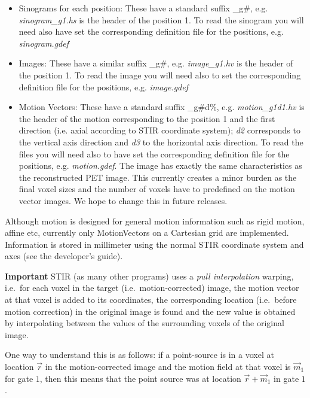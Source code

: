\documentclass{article}
\begin{document}
\begin{itemize}
\item Sinograms for each position: 
These have a standard suffix \_g\#, e.g. \textit{sinogram\_g1.hs} is the header of the
position 1. To read the sinogram you will need also have set the corresponding
definition file for the positions, e.g. \textit{sinogram.gdef}

\item Images:
These have a similar suffix \_g\#, e.g. \textit{image\_g1.hv} is the header of the
position 1. To read the image you will need also to set the corresponding
definition file for the positions, e.g. \textit{image.gdef}

\item Motion Vectors:
These have a standard suffix \_g\#d\%, e.g. \textit{motion\_g1d1.hv} is the header of the motion
corresponding to the position 1 and the first direction (i.e. axial according
to STIR coordinate system); \textit{d2} corresponds to the vertical axis
direction and \textit{d3} to the horizontal axis direction. To read the files you
will need also to have set the corresponding definition file for the positions,
e.g. \textit{motion.gdef}. The image has exactly the same characteristics as the
reconstructed PET image. This currently creates a minor burden as the final
voxel sizes and the number of voxels have to predefined on the motion vector
images. We hope to change this in future releases. 
\end{itemize}

{}

Although motion is designed for general motion
information such as rigid motion, affine etc, currently only MotionVectors on a
Cartesian grid are implemented. Information is stored in millimeter using the normal
STIR coordinate system and axes (see the developer's guide).

\textbf{Important} STIR (as many other programs) uses a 
\textit{pull interpolation} warping, i.e.\ for each voxel in the target
(i.e.\ motion-corrected) image, the motion vector
at that voxel is added to its coordinates, the corresponding location (i.e.\ before motion correction)
in the original image is found and the new value is obtained by interpolating 
between the values of the surrounding voxels of the original image.

One way to understand this is as follows: if a point-source is in a voxel at location $\vec r$ in the motion-corrected image
and the motion field at that voxel is $\vec m_1$ for gate $1$, then this means that the point source
was at location $\vec r + \vec m_1$ in gate $1$.
\end{document}
